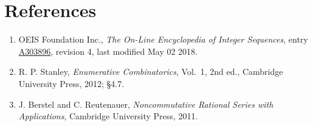 \documentclass[11pt]{article}
\theoremstyle{definition}
\begin{document}
\section{References}

\begin{enumerate}

\item OEIS Foundation Inc., \emph{The On-Line Encyclopedia of Integer Sequences}, entry \href{https://oeis.org/A303896}{A303896}, revision 4, last modified May 02 2018.

\item R. P. Stanley, \emph{Enumerative Combinatorics}, Vol.~1, 2nd ed., Cambridge University Press, 2012; \S4.7.

\item J. Berstel and C. Reutenauer, \emph{Noncommutative Rational Series with Applications}, Cambridge University Press, 2011.

\end{enumerate}
\end{document}
